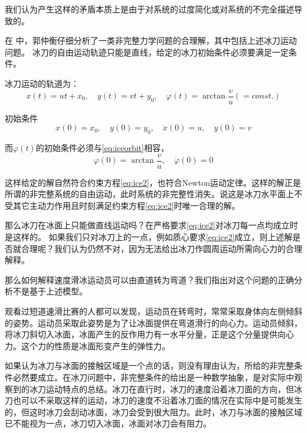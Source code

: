 \documentclass{ctexart}
\begin{document}
我们认为产生这样的矛盾本质上是由于对系统的过度简化或对系统的不完全描述导致的。


在  中，郭仲衡仔细分析了一类非完整力学问题的合理解，其中包括上述冰刀运动问题。
冰刀的自由运动轨迹只能是直线，给定的冰刀初始条件必须要满足一定条件。

冰刀运动的轨道为：
\begin{equation}
  \label{eq:iceorbit}
  x(t) = u t +x_0,\quad y(t) = v t + y_0,\quad \varphi (t) = \arctan \frac{v}{u}(= const.)
\end{equation}

初始条件
\begin{equation}
  \label{eq:initial}
  x(0) = x_0,\quad y(0) = y_0,\quad \dot{x}(0) = u,\quad \dot{y}(0) = v
\end{equation}

而$\varphi(t)$的初始条件必须与\eqref{eq:iceorbit}相容，
\begin{equation}
  \label{eq:initial2}
  \varphi(0) = \arctan \frac{v}{u},\quad \dot{\varphi}(0) = 0
\end{equation}

这样给定的解自然符合约束方程\eqref{eq:ice2}，也符合Newton运动定律。这样的解正是所谓的非完整系统的自由运动，此时系统的非完整性消失。说这是冰刀水平面上不受其它主动力作用且时刻满足约束方程\eqref{eq:ice2}时唯一合理的解。



那么冰刀在冰面上只能做直线运动吗？在严格要求\eqref{eq:ice2}对冰刀每一点均成立时是这样的。
如果我们只对冰刀上的一点，例如质心要求\eqref{eq:ice2}成立，则上述解是否就合理呢？我们认为仍然不对，因为无法给出冰刀作圆周运动所需向心力的合理解释。

那么如何解释速度滑冰运动员可以由直道转为弯道？我们指出对这个问题的正确分析不是基于上述模型。


观看过短道速滑比赛的人都可以发现，运动员在转弯时，常常采取身体向左侧倾斜的姿势。运动员采取此姿势是为了让冰面提供在弯道滑行的向心力。运动员倾斜，将冰刀斜切入冰面，冰面产生的反作用力有一水平分量，正是这个分量提供向心力。这个力的性质是冰面形变产生的弹性力。


如果认为冰刀与冰面的接触区域是一个点的话，则没有理由认为，所给的非完整条件必然要成立。在冰刀问题中，非完整条件的给出是一种数学抽象，是对实际中观察到的冰刀运动特点的总结。冰刀在直行时，冰刀的速度沿着冰刀面的方向，但冰刀也可以不采取这样的运动，冰刀的速度不沿着冰刀面的情况在实际中是可能发生的，但这时冰刀会刮动冰面，冰刀会受到很大阻力。此时，冰刀与冰面的接触区域已不能视为一点，冰刀切入冰面，冰面对冰刀会有阻力。
\end{document}
